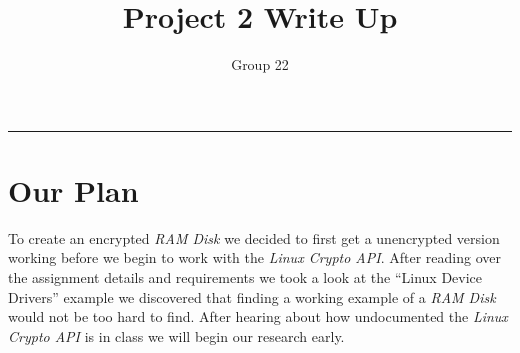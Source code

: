 \documentclass[letterpaper,10pt,notitlepage,fleqn]{article}
\title{Project 2 Write Up}
\author{Group 22}
\begin{document}
\maketitle
\hrule

\section*{Our Plan}
    To create an encrypted \textit{RAM Disk} we decided to first get a unencrypted 
    version working before we begin to work with the \textit{Linux Crypto API}. 
    After reading over the assignment details and requirements we took a look at 
    the ``Linux Device Drivers'' example we discovered that finding a working example 
    of a \textit{RAM Disk} would not be too hard to find. After hearing about how 
    undocumented the \textit{Linux Crypto API} is in class we will begin our research 
    early. 
\end{document}
